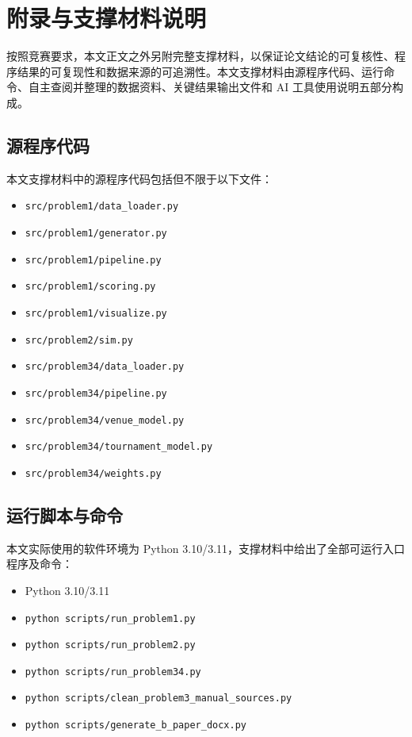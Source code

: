 \documentclass[UTF8,a4paper,12pt]{ctexart}
\begin{document}
\appendix
\section{附录与支撑材料说明}

按照竞赛要求，本文正文之外另附完整支撑材料，以保证论文结论的可复核性、程序结果的可复现性和数据来源的可追溯性。本文支撑材料由源程序代码、运行命令、自主查阅并整理的数据资料、关键结果输出文件和 AI 工具使用说明五部分构成。

\subsection{源程序代码}

本文支撑材料中的源程序代码包括但不限于以下文件：
\begin{itemize}
  \item \texttt{src/problem1/data\_loader.py}
  \item \texttt{src/problem1/generator.py}
  \item \texttt{src/problem1/pipeline.py}
  \item \texttt{src/problem1/scoring.py}
  \item \texttt{src/problem1/visualize.py}
  \item \texttt{src/problem2/sim.py}
  \item \texttt{src/problem34/data\_loader.py}
  \item \texttt{src/problem34/pipeline.py}
  \item \texttt{src/problem34/venue\_model.py}
  \item \texttt{src/problem34/tournament\_model.py}
  \item \texttt{src/problem34/weights.py}
\end{itemize}

\subsection{运行脚本与命令}

本文实际使用的软件环境为 Python 3.10/3.11，支撑材料中给出了全部可运行入口程序及命令：
\begin{itemize}
  \item Python 3.10/3.11
  \item \texttt{python scripts/run\_problem1.py}
  \item \texttt{python scripts/run\_problem2.py}
  \item \texttt{python scripts/run\_problem34.py}
  \item \texttt{python scripts/clean\_problem3\_manual\_sources.py}
  \item \texttt{python scripts/generate\_b\_paper\_docx.py}
\end{itemize}
\end{document}
